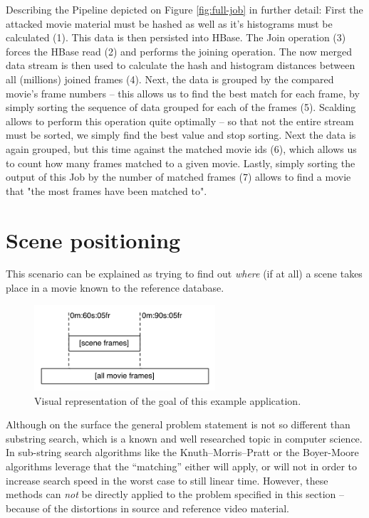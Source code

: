 Describing the Pipeline depicted on Figure \ref{fig:full-job} in further detail: First the attacked movie material must be hashed as well as it's histograms must be calculated (1). This data is then persisted into HBase. The Join operation (3) forces the HBase read (2) and performs the joining operation. The now merged data stream is then used to calculate the hash and histogram distances between all (millions) joined frames (4). Next, the data is grouped by the compared movie's frame numbers -- this allows us to find the best match for each frame, by simply sorting the sequence of data grouped for each of the frames (5). Scalding allows to perform this operation quite optimally -- so that not the entire stream must be sorted, we simply find the best value and stop sorting. Next the data is again grouped, but this time against the matched movie ids (6), which allows us to count how many frames matched to a given movie. Lastly, simply sorting the output of this Job by the number of matched frames (7) allows to find a movie that "the most frames have been matched to".


\section{Scene positioning}
\label{sec:scene-detection}
This scenario can be explained as trying to find out \textit{where} (if at all) a scene takes place in a movie known to the reference database. 

\begin{figure}[ch!]
  \centering
  \includegraphics[width=0.6\textwidth]{img/frames-timeline-matching}
  \caption{Visual representation of the goal of this example application.}
\end{figure}

Although on the surface the general problem statement is not so different than substring search, which is a known and well researched topic in computer science. In sub-string search algorithms like the Knuth–Morris–Pratt \cite{kmp-string-search} or the Boyer-Moore \cite{boyer-string-search} algorithms leverage that the ``matching'' either will apply, or will not in order to increase search speed in the worst case to still linear time. However, these methods can \textit{not} be directly applied to the problem specified in this section -- because of the distortions in source and reference video material.

